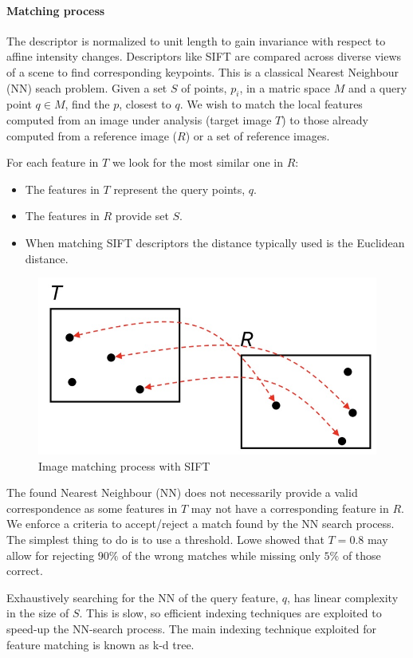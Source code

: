 \paragraph{Matching process}
The descriptor is normalized to unit length to gain invariance with respect to affine intensity changes.
Descriptors like SIFT are compared across diverse views of a scene to find corresponding keypoints.
This is a classical Nearest Neighbour (NN) seach problem.
Given a set $S$ of points, $p_i$, in a matric space $M$ and a query point $q \in M$, find the $p$, closest to $q$.
We wish to match the local features computed from an image under analysis (target image $T$) to those already computed from a reference image ($R$) or a set of reference images.

For each feature in $T$ we look for the most similar one in $R$:
\begin{itemize}
  \item The features in $T$ represent the query points, $q$.
  \item The features in $R$ provide set $S$.
  \item When matching SIFT descriptors the distance typically used is the Euclidean distance.
\end{itemize}

\begin{figure}[htbp]
  \centering
  \includegraphics[width=0.5\linewidth]{./img/matching_sift.jpg}
  \caption{Image matching process with SIFT}
  \label{fig:matching_sift}
\end{figure}

The found Nearest Neighbour (NN) does not necessarily provide a valid correspondence as some features in $T$ may not have a corresponding feature in $R$.
We enforce a criteria to accept/reject a match found by the NN search process.
The simplest thing to do is to use a threshold.
Lowe showed that $T=0.8$ may allow for rejecting $90\%$ of the wrong matches while missing only $5\%$ of those correct.

Exhaustively searching for the NN of the query feature, $q$, has linear complexity in the size of $S$.
This is slow, so efficient indexing techniques are exploited to speed-up the NN-search process.
The main indexing technique exploited for feature matching is known as k-d tree.

